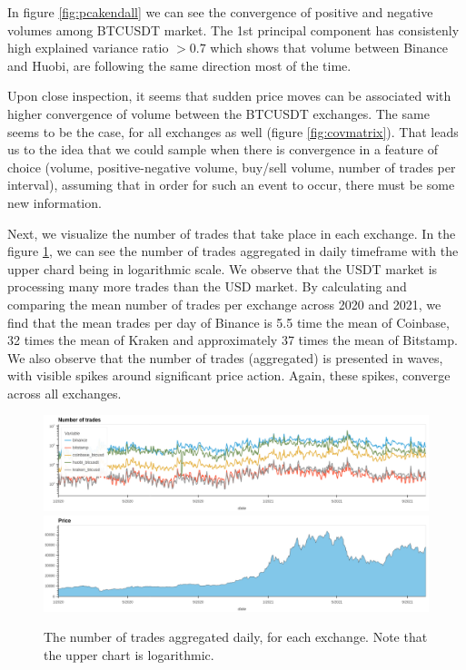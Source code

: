 \documentclass[10pt]{asme2ej}
\begin{document}
In figure \ref{fig:pcakendall} we can see the convergence of positive and negative volumes among BTCUSDT market. The 1st principal component has consistenly high explained variance ratio \( > 0.7 \) which shows that volume between Binance and Huobi, are following the same direction most of the time.

Upon close inspection, it seems that sudden price moves can be associated with higher convergence of volume between the BTCUSDT exchanges. The same seems to be the case, for all exchanges as well (figure \ref{fig:covmatrix}). That leads us to the idea that we could sample when there is convergence in a feature of choice (volume, positive-negative volume, buy/sell volume, number of trades per interval), assuming that in order for such an event to occur, there must be some new information. 

Next, we visualize the number of trades that take place in each exchange. In the figure \ref{fig:nooftrades}, we can see the number of trades aggregated in daily timeframe with the upper chard being in logarithmic scale. We observe that the USDT market is processing many more trades than the USD market. By calculating and comparing the mean number of trades per exchange across 2020 and 2021, we find that the mean trades per day of Binance is 5.5 time the mean of Coinbase, 32 times the mean of Kraken and approximately 37 times the mean of Bitstamp. We also observe that the number of trades (aggregated) is presented in waves, with visible spikes around significant price action. Again, these spikes, converge across all exchanges.  

\begin{figure}[H]
	\centering
	\includegraphics[width=12cm, height = 2.8cm]{No_of_trades_all2.png} \\
	\includegraphics[width=12cm, height = 2.8cm]{No_of_trades_all1.png} \\ 
	\caption{The number of trades aggregated daily, for each exchange. Note that the upper chart is logarithmic.}
	\label{fig:nooftrades}
\end{figure}
\end{document}
